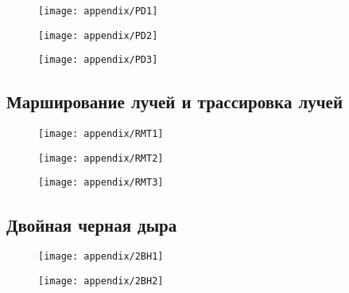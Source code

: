 \begin{figure}[H]
    \centering
    \texttt{[image: appendix/PD1]}
\end{figure}

\begin{figure}[H]
    \centering
    \texttt{[image: appendix/PD2]}
\end{figure}

\begin{figure}[H]
    \centering
    \texttt{[image: appendix/PD3]}
\end{figure}

\subsection*{Марширование лучей и трассировка лучей}

\begin{figure}[H]
    \centering
    \texttt{[image: appendix/RMT1]}
\end{figure}

\begin{figure}[H]
    \centering
    \texttt{[image: appendix/RMT2]}
\end{figure}

\begin{figure}[H]
    \centering
    \texttt{[image: appendix/RMT3]}
\end{figure}

\subsection*{Двойная черная дыра}

\begin{figure}[H]
    \centering
    \texttt{[image: appendix/2BH1]}
\end{figure}

\begin{figure}[H]
    \centering
    \texttt{[image: appendix/2BH2]}
\end{figure}

\newpage
